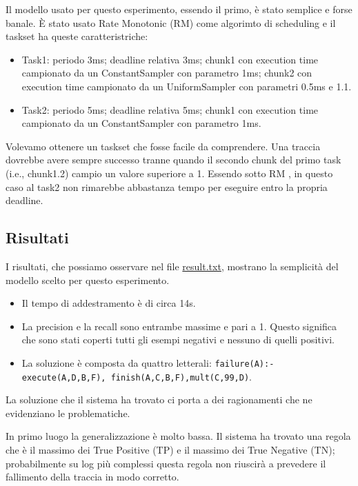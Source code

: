\myskip

Il modello usato per questo esperimento, essendo il primo, è stato semplice e forse banale. È stato usato Rate Monotonic (RM) come algorimto di scheduling e il taskset ha queste caratteristriche:
\begin{itemize}
    \item Task1: periodo 3ms; deadline relativa 3ms; chunk1 con execution time campionato da un ConstantSampler con parametro 1ms; chunk2 con execution time campionato da un UniformSampler con parametri 0.5ms e 1.1.
    \item Task2: periodo 5ms; deadline relativa 5ms; chunk1 con execution time campionato da un ConstantSampler con parametro 1ms.
\end{itemize}

Volevamo ottenere un taskset che fosse facile da comprendere. Una traccia dovrebbe avere sempre successo tranne quando il secondo chunk del primo task (i.e., chunk1.2) campio un valore superiore a 1. Essendo sotto RM , in questo caso al task2 non rimarebbe abbastanza tempo per eseguire entro la propria deadline.

\subsection{Risultati}
I risultati, che possiamo osservare nel file \href{https://github.com/edoardosarri24/numsynth/tree/main/my-experiments/1-start/result.txt}{result.txt}, mostrano la semplicità del modello scelto per questo esperimento.
\begin{itemize}
    \item Il tempo di addestramento è di circa 14s.
    \item La precision e la recall sono entrambe massime e pari a 1. Questo significa che sono stati coperti tutti gli esempi negativi e nessuno di quelli positivi.
    \item La soluzione è composta da quattro letterali: \texttt{failure(A):-execute(A,D,B,F), \allowbreak finish(A,C,B,F),mult(C,99,D)}.
\end{itemize}

\myskip

La soluzione che il sistema ha trovato ci porta a dei ragionamenti che ne evidenziano le problematiche.

In primo luogo la generalizzazione è molto bassa. Il sistema ha trovato una regola che è il massimo dei True Positive (TP) e il massimo dei True Negative (TN); probabilmente su log più complessi questa regola non riuscirà a prevedere il fallimento della traccia in modo corretto.

